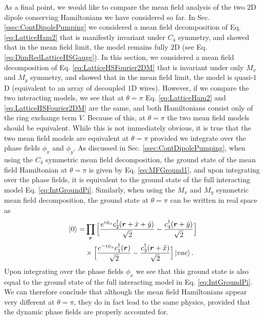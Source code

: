 \documentclass[prb,aps,twocolumn,groupaddress,floatfix]{revtex4-1}
\begin{document}
As a final point, we would like to compare the mean field analysis of the two $2$D dipole conserving Hamiltonians we have considered so far. In Sec. \ref{ssec:ContDipolePumping} we considered a mean field decomposition of Eq. \ref{eq:LatticeHam2} that is manifestly invariant under $C_4$ symmetry, and showed that in the mean field limit, the model remains fully $2$D (see Eq. \ref{eq:DimRedLatticeHSGauge}). In this section, we considered a mean field decomposition of Eq. \ref{eq:LatticeHSFourier2DM} that is invariant under only $M_x$ and $M_y$ symmetry, and showed that in the mean field limit, the model is quasi-$1$D (equivalent to an array of decoupled $1$D wires). However, if we compare the two interacting models, we see that at $\theta = \pi$ Eq. \ref{eq:LatticeHam2} and \ref{eq:LatticeHSFourier2DM} are the same, and both Hamiltonians consist only of the ring exchange term $V$. Because of this, at $\theta=\pi$ the two mean field models should be equivalent. While this is not immediately obvious, it is true that the two mean field models are equivalent at $\theta = \pi$ provided we integrate over the phase fields $\phi_x$ and $\phi_y$. As discussed in Sec. \ref{ssec:ContDipolePumping}, when using the $C_4$ symmetric mean field decomposition, the ground state of the mean field Hamiltonian at $\theta = \pi$ is given by Eq. \ref{eq:MFGround1}, and upon integrating over the phase fields, it is equivalent to the ground state of the full interacting model Eq. \ref{eq:IntGroundPi}. Similarly, when using the $M_x$ and $M_y$ symmetric mean field decomposition, the ground state at $\theta = \pi$ can be written in real space as 
\begin{equation}\begin{split}
\ket{0} = &\prod_{\bm{r}} \Big[\frac{e^{i\phi_x} c^\dagger_2(\bm{r}+\hat{x}+\hat{y})}{\sqrt{2}}  - \frac{c^\dagger_4(\bm{r}+\hat{y})}{\sqrt{2}}\Big]\\&\times \Big[\frac{e^{-i\phi_x} c^\dagger_1(\bm{r})}{\sqrt{2}}  - \frac{c^\dagger_3(\bm{r}+\hat{x})}{\sqrt{2}}\Big]\ket{vac}.
\end{split}\label{eq:MFGround2}
\end{equation}
Upon integrating over the phase fields $\phi_x$ we see that this ground state is also equal to the ground state of the full interacting model in Eq. \ref{eq:IntGroundPi}. We can therefore conclude that although the mean field Hamiltonians appear very different at $\theta = \pi$, they do in fact lead to the same physics, provided that the dynamic phase fields are properly accounted for.
\end{document}
